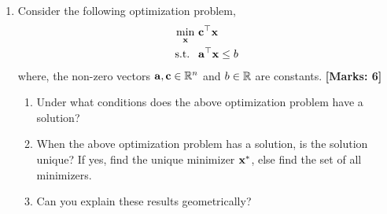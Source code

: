 \documentclass[12pt]{article}
\def\mf{\ensuremath\mathbf}
\def\mb{\ensuremath\mathbb}
\begin{document}
\begin{enumerate}
    \item Consider the following optimization problem,
    \[  \begin{split}
        \min_{\mf{x}} &\,\, \mf{c}^\top\mf{x} \\
        \text{s.t. } &\,\, \mf{a}^\top \mf{x} \leq b
        \end{split} \]
    where, the non-zero vectors $\mf{a}, \mf{c} \in \mb{R}^n$ and $b \in \mb{R}$ are constants.  \textbf{[Marks: 6]}
    \begin{enumerate}
        \item Under what conditions does the above optimization problem have a solution?
        \item When the above optimization problem has a solution, is the solution unique? If yes, find the unique minimizer $\mf{x}^*$, else find the set of all minimizers.
        \item Can you explain these results geometrically?
    \end{enumerate}
\end{enumerate}
\end{document}
